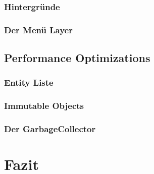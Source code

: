 		\subsubsection{Hintergründe}				\label{sec:F7}		\clearpage
		\subsubsection{Der Menü Layer}				\label{sec:F8}		\clearpage
	\subsection{Performance Optimizations}			\label{sec:O0}		\clearpage
		\subsubsection{Entity Liste}				\label{sec:O1}		\clearpage
		\subsubsection{Immutable Objects}			\label{sec:O2}		\clearpage
		\subsubsection{Der GarbageCollector}		\label{sec:O3}		\clearpage
\section{Fazit}                                     \label{sec:R0}		\clearpage
